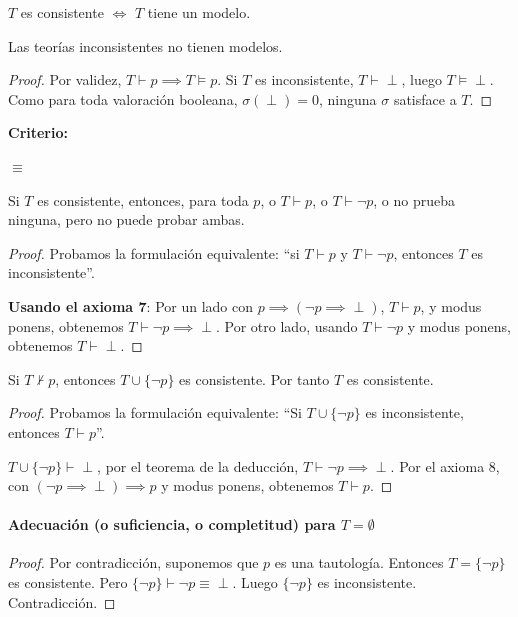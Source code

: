 \begin{theorem}
	$T$ es consistente $\iff$ $T$ tiene un modelo.
\end{theorem}
\begin{corol}
	Las teorías inconsistentes no tienen modelos.
\end{corol}
\begin{proof}
	Por validez, $T\vdash p \implies T\vDash p$. Si $T$ es inconsistente, $T\vdash \perp$, luego $T\vDash\perp$. Como para toda valoración booleana, $\sigma(\perp) = 0$, ninguna $\sigma$ satisface a $T$.
\end{proof}

\noindent\textbf{Criterio: }\mbox{}

	 $\equiv$ 


\begin{theorem}
	Si $T$ es consistente, entonces, para toda $p$, o $T\vdash p$, o $T\vdash \neg p$, o no prueba ninguna, pero no puede probar ambas.
\end{theorem}
\begin{proof}\mbox{}
	
	Probamos la formulación equivalente: ``si $T\vdash p$ y $T\vdash \neg p$, entonces $T$ es inconsistente''.
	
	\textbf{Usando el axioma 7}: 
	Por un lado con $p\implies(\neg p \implies \perp)$, $T\vdash p$, y modus ponens, obtenemos $T\vdash \neg p \implies \perp$. Por otro lado, usando $T\vdash \neg p$ y modus ponens, obtenemos $T\vdash\perp$.
\end{proof}

\begin{theorem}
	Si $T \nvdash p$, entonces $T\cup \{\neg p\}$ es consistente. Por tanto $T$ es consistente.
\end{theorem}
\begin{proof}\mbox{}
	
	Probamos la formulación equivalente:  ``Si $T\cup \{\neg p\}$ es inconsistente, entonces $T\vdash p$''.
	
	$T\cup \{\neg p\}\vdash \perp$, por el teorema de la deducción, $T\vdash \neg p\implies \perp$. Por el axioma 8, con $(\neg p \implies \perp)\implies p$ y modus ponens, obtenemos $T\vdash p$.
\end{proof}

\paragraph*{Adecuación (o suficiencia, o completitud) para $T=\emptyset$}\mbox{}
\begin{proof}
	Por contradicción, suponemos que $p$ es una tautología. Entonces $T = \{\neg p \}$ es consistente. Pero $\{\neg p\}\vdash \neg p\equiv \perp$. Luego $\{\neg p\}$ es inconsistente. Contradicción.
\end{proof}